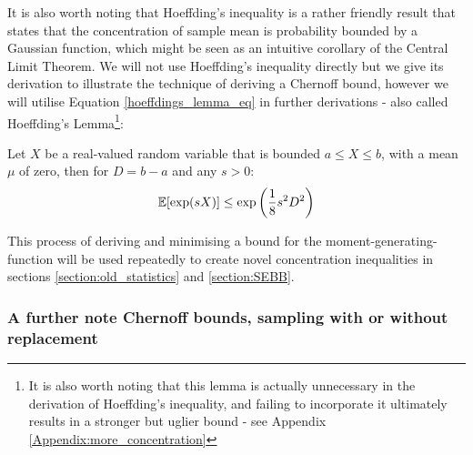 
It is also worth noting that Hoeffding's inequality is a rather friendly result that states that the concentration of sample mean is probability bounded by a Gaussian function, which might be seen as an intuitive corollary of the Central Limit Theorem. 
We will not use Hoeffding's inequality directly but we give its derivation to illustrate the technique of deriving a Chernoff bound, however we will utilise Equation \ref{hoeffdings_lemma_eq} in further derivations - also called Hoeffding's Lemma\footnote{It is also worth noting that this lemma is actually unnecessary in the derivation of Hoeffding's inequality, and failing to incorporate it ultimately results in a stronger but uglier bound - see Appendix \ref{Appendix:more_concentration}}:

\begin{lemma}\label{Hoeffdings_lemma_lemma}
Let $X$ be a real-valued random variable that is bounded $a\le X\le b$, with a mean $\mu$ of zero, then for $D=b-a$ and any $s>0$:
$$\operatorname{\mathbb{E}}[\exp(sX)] \le \exp\left(\frac{1}{8}s^2D^2 \right)$$
\end{lemma}

This process of deriving and minimising a bound for the moment-generating-function will be used repeatedly to create novel concentration inequalities in sections \ref{section:old_statistics} and \ref{section:SEBB}.



\subsubsection{A further note Chernoff bounds, sampling with or without replacement}

